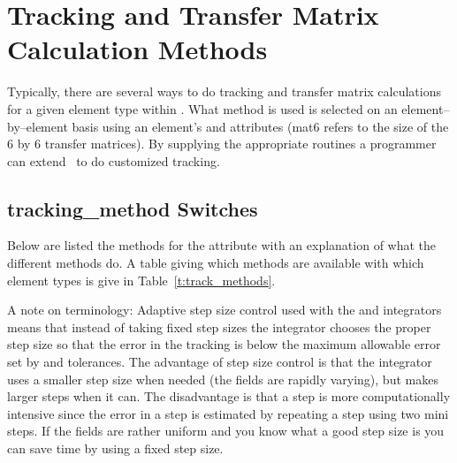 \chapter{Tracking and Transfer Matrix Calculation Methods}

Typically, there are several ways to do tracking and transfer matrix
calculations for a given element type within \bmad. What method is used
is selected on an element--by--element basis using
an element's  and  attributes 
(mat6 refers to the size of the 6 by 6 transfer matrices). By supplying
the appropriate routines a programmer can extend \bmad\ to do customized 
tracking.

\section{tracking\_method Switches}
\label{s:tkm}

Below are listed the methods for the 
attribute with an explanation of what the different methods do. A
table giving which methods are available with which element types is give
in Table~\ref{t:track_methods}. 

A note on terminology: Adaptive step size control used with the
 and  integrators means that 
instead of taking fixed step sizes the integrator chooses the proper
step size so that the error in the tracking is below the maximum
allowable error set by  and  tolerances. The
advantage of step size control is that the integrator uses a smaller
step size when needed (the fields are rapidly varying), but makes
larger steps when it can. The disadvantage is that a step is more
computationally intensive since the error in a step is estimated by
repeating a step using two mini steps. If the fields are rather
uniform and you know what a good step size is you can save time by using
a fixed step size.

